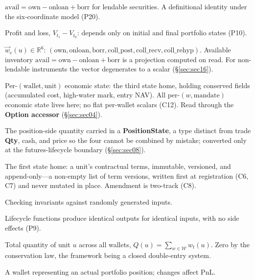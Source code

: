 \begin{description}[style=nextline]
\item[Ownership consistency] $\mathrm{avail}=\mathrm{own}-\mathrm{onloan}+\mathrm{borr}$ for lendable securities. A definitional identity under the six-coordinate model (P20).

\item[PnL] Profit and loss, $V_{t_1}-V_{t_0}$: depends only on initial and final portfolio states (P10).

\item[Position vector] $\vec{w}_e(u)\in\mathbb{R}^6$: $(\mathrm{own},\mathrm{onloan},\mathrm{borr},\mathrm{coll\_post},\mathrm{coll\_recv},\mathrm{coll\_rehyp})$. Available inventory $\mathrm{avail}=\mathrm{own}-\mathrm{onloan}+\mathrm{borr}$ is a projection computed on read. For non-lendable instruments the vector degenerates to a scalar (\S\ref{sec:sec16}).

\item[PositionState] Per-$(\text{wallet},\text{unit})$ economic state: the third state home, holding conserved fields (accumulated cost, high-water mark, entry NAV). All per-$(w,\text{mandate})$ economic state lives here; no flat per-wallet scalars (C12). Read through the \textbf{Option accessor} (\S\ref{sec:sec04}).

\item[PosQty] The position-side quantity carried in a \textbf{PositionState}, a type distinct from trade \textbf{Qty}, cash, and price so the four cannot be combined by mistake; converted only at the futures-lifecycle boundary (\S\ref{sec:sec08}).

\item[ProductTerms] The first state home: a unit's contractual terms, immutable, versioned, and append-only---a non-empty list of term versions, written first at registration (C6, C7) and never mutated in place. Amendment is two-track (C8).

\item[Property-based testing] Checking invariants against randomly generated inputs.

\item[Purity] Lifecycle functions produce identical outputs for identical inputs, with no side effects (P9).

\item[$Q(u)$] Total quantity of unit $u$ across all wallets, $Q(u)=\sum_{w\in\mathcal{W}}w_t(u)$. Zero by the conservation law, the framework being a closed double-entry system.

\item[Real wallet] A wallet representing an actual portfolio position; changes affect PnL.


\end{description}
